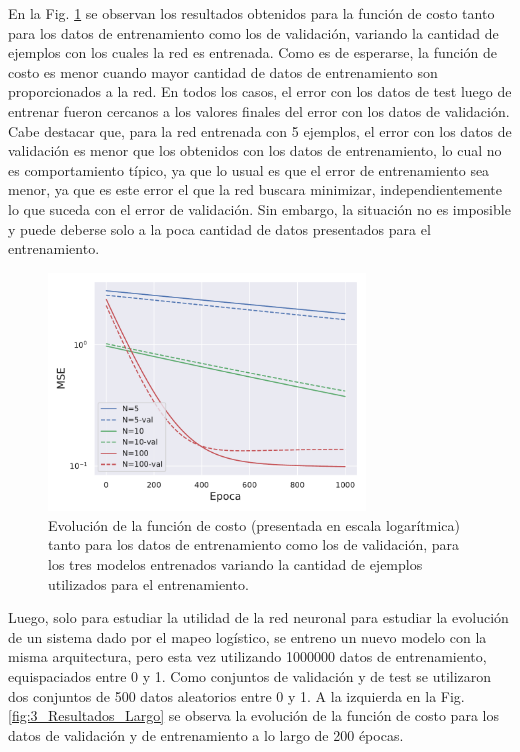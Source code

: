 En la Fig. \ref{03:fig:Resultados} se observan los resultados obtenidos para la función de costo tanto para los datos de entrenamiento como los de validación, variando la cantidad de ejemplos con los cuales la red es entrenada. Como es de esperarse, la función de costo es menor cuando mayor cantidad de datos de entrenamiento son proporcionados a la red. En todos los casos, el error con los datos de test luego de entrenar fueron cercanos a los valores finales del error con los datos de validación. Cabe destacar que, para la red entrenada con 5 ejemplos, el error con los datos de validación es menor que los obtenidos con los datos de entrenamiento, lo cual no es comportamiento típico, ya que lo usual es que el error de entrenamiento sea menor, ya que es este error el que la red buscara minimizar, independientemente lo que suceda con el error de validación. Sin embargo, la situación no es imposible y puede deberse solo a la poca cantidad de datos presentados para el entrenamiento. 

\begin{figure}[h!]
    \centering
    \includegraphics[width=0.75\textwidth]{Figuras/ej3/Loss.pdf}
    \caption{Evolución de la función de costo (presentada en escala logarítmica) tanto para los datos de entrenamiento como los de validación, para los tres modelos entrenados variando la cantidad de ejemplos utilizados para el entrenamiento.}
    \label{03:fig:Resultados}
\end{figure}

Luego, solo para estudiar la utilidad de la red neuronal para estudiar la evolución de un sistema dado por el mapeo logístico, se entreno un nuevo modelo con la misma arquitectura, pero esta vez utilizando 1000000 datos de entrenamiento, equispaciados entre 0 y 1. Como conjuntos de validación y de test se utilizaron dos conjuntos de 500 datos aleatorios entre 0 y 1. A la izquierda en la Fig. \ref{fig:3_Resultados_Largo} se observa la evolución de la función de costo para los datos de validación y de entrenamiento a lo largo de 200 épocas.


